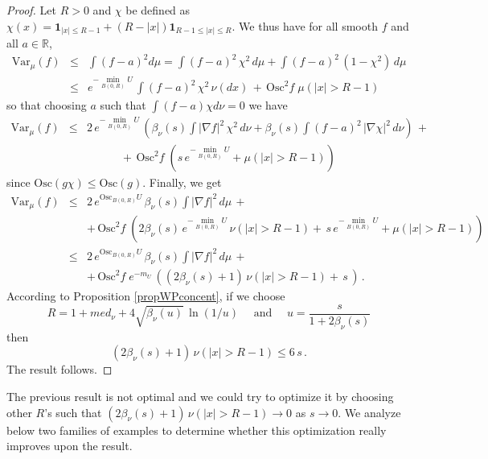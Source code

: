 \documentclass[11pt,reqno]{amsart}
\numberwithin{equation}{section}
\theoremstyle{definition}
\theoremstyle{remark}
\def \Var {\textrm{Var}}
\def \Osc {\textrm{Osc}}
\begin{document}
\begin{proof}
Let $R>0$ and $\chi$ be defined as $\chi(x)=\mathbf 1_{|x|\leq R-1}+(R-|x|)\mathbf 1_{R-1\leq |x|\leq R}$. We thus have for all smooth $f$ and all $a \in \mathbb R$,
\begin{eqnarray*}
\Var_\mu(f) &\leq& \int (f-a)^2 d\mu = \int (f-a)^2 \, \chi^2 \,  d\mu + \int (f-a)^2 \, (1-\chi^2) \, d\mu \\ &\leq& e^{- \min_{B(0,R)}U} \, \int (f-a)^2 \, \chi^2 \, \nu(dx) \, + \, \Osc^2 f \; \mu(|x|>R-1) 
\end{eqnarray*}
so that choosing $a$ such that $\int (f-a) \chi d\nu=0$ we have
\begin{eqnarray*} 
\Var_\mu(f) &\leq& 2 \, e^{-\min_{B(0,R)}U} \, \left(\beta_\nu(s) \int |\nabla f|^2 \, \chi^2 \, d\nu + \beta_\nu(s) \int (f-a)^2 \, |\nabla\chi|^2 \, d\nu\right) \, + \\ && \quad \quad \quad + \, \Osc^2 f \; \left(s \, e^{-\min_{B(0,R)}U} + \mu(|x|>R-1)\right)
\end{eqnarray*}
since $\Osc(g\chi) \leq \Osc(g)$. Finally, we get
\begin{eqnarray*} 
\Var_\mu(f) &\leq& 2 \, e^{\Osc_{B(0,R)}U} \, \beta_\nu(s) \int |\nabla f|^2 \,  d\mu \, + \, \\ &&  + \, \Osc^2 f \; \left(2\beta_\nu(s) \, e^{-\min_{B(0,R)}U} \,  \nu(|x|>R-1) + \,  s \, e^{-\min_{B(0,R)}U} + \mu(|x|>R-1)\right) \, \\ &\leq& 2 \, e^{\Osc_{B(0,R)}U} \, \beta_\nu(s) \int |\nabla f|^2 \,  d\mu \, + \, \\ &&  + \, \Osc^2 f \;  e^{-m_U} \, \left((2\beta_\nu(s)+1) \,  \nu(|x|>R-1) + \,  s \, \right) \, .
\end{eqnarray*}
According to Proposition \ref{propWPconcent}, if we choose $$R=1+med_\nu+4\sqrt{\beta_\nu(u)} \, \ln(1/u) \quad \textrm{ and } \quad u=\frac{s}{1+2\beta_\nu(s)}$$ then $$(2\beta_\nu(s)+1) \,  \nu(|x|>R-1) \leq 6 \, s \, .$$ The result follows.
\end{proof}
The previous result is not optimal and we could try to optimize it by choosing other $R$'s such that $(2\beta_\nu(s)+1) \,  \nu(|x|>R-1) \to 0$ as $s \to 0$. We analyze below two families of examples to determine whether this optimization really improves upon the result.
\end{document}

